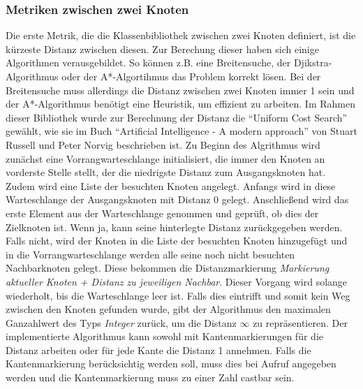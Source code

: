 \documentclass[a4paper,12pt,ngerman,chapterprefix=false,listof=totoc,bibliography=totoc]{scrreprt}
\begin{document}
{{\subsubsection*{Metriken zwischen zwei Knoten}
{
Die erste Metrik, die die Klassenbibliothek zwischen zwei Knoten definiert, ist die kürzeste Distanz zwischen diesen. Zur Berechung dieser haben sich einige Algorithmen verausgebildet. So können z.B. eine Breitensuche, der Djikstra-Algorithmus oder der A*-Algortihmus das Problem korrekt lösen. Bei der Breitensuche muss allerdings die Distanz zwischen zwei Knoten immer 1 sein und der A*-Algorithmus benötigt eine Heuristik, um effizient zu arbeiten. Im Rahmen dieser Bibliothek wurde zur Berechnung der Distanz die "`Uniform Cost Search"' gewählt, wie sie im Buch "`Artificial Intelligence - A modern approach"' von Stuart Russell und Peter Norvig beschrieben ist. Zu Beginn des Algrithmus wird zunächst eine Vorrangwarteschlange initialisiert, die immer den Knoten an vorderste Stelle stellt, der die niedrigste Distanz zum Ausgangsknoten hat. Zudem wird eine Liste der besuchten Knoten angelegt. Anfangs wird in diese Warteschlange der Ausgangsknoten mit Distanz 0 gelegt. Anschließend wird das erste Element aus der Warteschlange genommen und geprüft, ob dies der Zielknoten ist. Wenn ja, kann seine hinterlegte Distanz zurückgegeben werden. Falls nicht, wird der Knoten in die Liste der besuchten Knoten hinzugefügt und in die Vorrangwarteschlange werden alle seine noch nicht besuchten Nachbarknoten gelegt. Diese bekommen die Distanzmarkierung \textit{Markierung aktueller Knoten + Distanz zu jeweiligen Nachbar}. Dieser Vorgang wird solange wiederholt, bis die Warteschlange leer ist. Falls dies eintrifft und somit kein Weg zwischen den Knoten gefunden wurde, gibt der Algorithmus den maximalen Ganzahlwert des Typs \textit{Integer} zurück, um die Distanz \(\infty\) zu repräsentieren. Der implementierte Algorithmus kann sowohl mit Kantenmarkierungen für die Distanz arbeiten oder für jede Kante die Distanz 1 annehmen. Falls die Kantenmarkierung berücksichtig werden soll, muss dies bei Aufruf angegeben werden und die Kantenmarkierung muss zu einer Zahl castbar sein. \cite{russell_artificial_2016}

}}}
\end{document}
